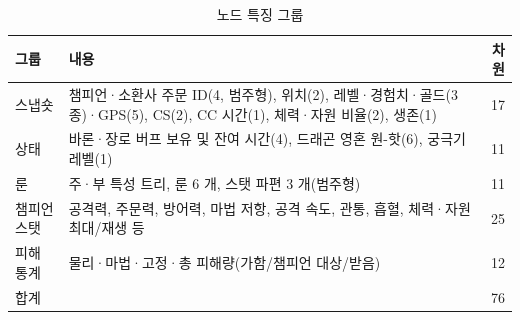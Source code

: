 \begin{table}[htbp]
  \centering
  \caption{노드 특징 그룹}
  \label{tab:node-groups}
  \small
  \begin{tabularx}{\linewidth}{@{}lXr@{}}
    \toprule
    그룹 & 내용 & 차원 \\
    \midrule
    스냅숏 & 챔피언·소환사 주문 ID(4, 범주형), 위치(2), 레벨·경험치·골드(3종)·GPS(5), CS(2), CC 시간(1), 체력·자원 비율(2), 생존(1) & 17 \\
    상태 & 바론·장로 버프 보유 및 잔여 시간(4), 드래곤 영혼 원-핫(6), 궁극기 레벨(1) & 11 \\
    룬 & 주·부 특성 트리, 룬 6 개, 스탯 파편 3 개(범주형) & 11 \\
    챔피언 스탯 & 공격력, 주문력, 방어력, 마법 저항, 공격 속도, 관통, 흡혈, 체력·자원 최대/재생 등 & 25 \\
    피해 통계 & 물리·마법·고정·총 피해량(가함/챔피언 대상/받음) & 12 \\
    \midrule
    합계 & & 76 \\
    \bottomrule
  \end{tabularx}
\end{table}

